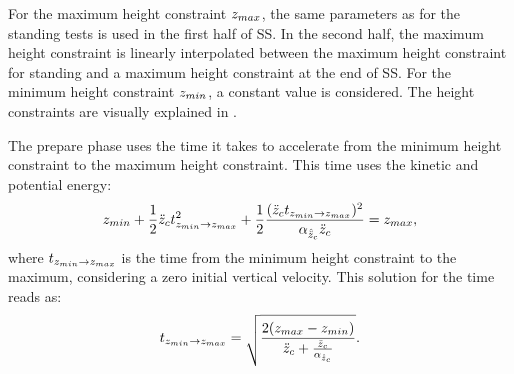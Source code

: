 For the maximum height constraint $z_{max}$, the same parameters as for the standing tests is used in the first half of \ac{SS}. In the second half, the maximum height constraint is linearly interpolated between the maximum height constraint for standing and a maximum height constraint at the end of \ac{SS}.  For the minimum height constraint $z_{min}$, a constant value is considered. The height constraints are visually explained in .

The prepare phase uses the time it takes to accelerate from the minimum height constraint to the maximum height constraint. This time uses the kinetic and potential energy:
\begin{equation}
	z_{min} + \frac{1}{2}\ddot{z}_{c} t_{z_{min} \rightarrow z_{max}}^2 + \frac{1}{2}\frac{(\ddot{z}_{c} t_{z_{min} \rightarrow z_{max}})^2}{\alpha_{\hat{\ddot{z}}_{c}} \ddot{z}_{c}} = z_{max},
\end{equation}
where $t_{z_{min} \rightarrow z_{max}}$ is the time from the minimum height constraint to the maximum, considering a zero initial vertical velocity.
This solution for the time reads as:
\begin{equation}
 t_{z_{min} \rightarrow z_{max}}= \sqrt{\frac{2(z_{max} - z_{min})}{\ddot{z}_{c} + \frac{\ddot{z}_{c}}{\alpha_{\hat{\ddot{z}}_{c}}} }}.
\end{equation}

